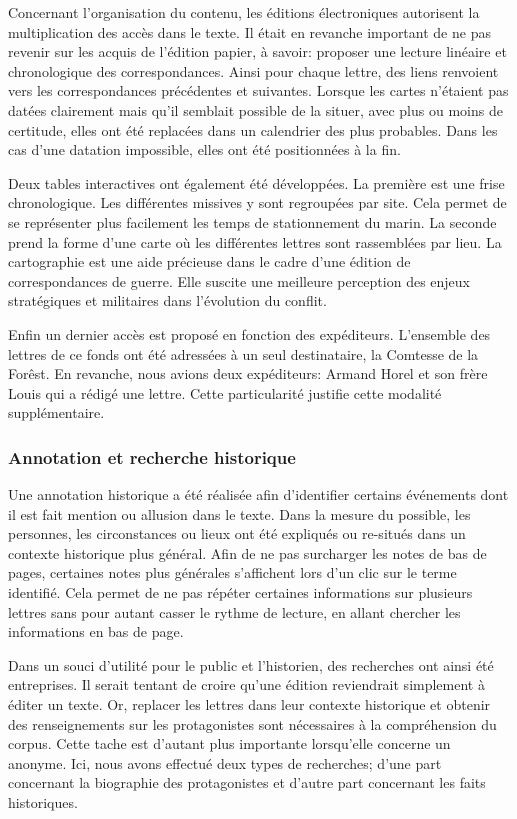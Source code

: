 \documentclass[12pt,a4paper]{book} %
\begin{document}
\medskip
Concernant l'organisation du contenu, les éditions électroniques autorisent la multiplication des accès dans le texte. Il était en revanche important de ne pas revenir sur les acquis de l'édition papier, à savoir: proposer une lecture linéaire et chronologique des correspondances. Ainsi pour chaque lettre, des liens renvoient vers les correspondances précédentes et suivantes. Lorsque les cartes n'étaient pas datées clairement mais qu'il semblait possible de la situer, avec plus ou moins de certitude, elles ont été replacées dans un calendrier des plus probables. Dans les cas d'une datation impossible, elles ont été positionnées à la fin. 

Deux \og tables \fg{} interactives ont également été développées. La première est une frise chronologique. Les différentes missives y sont regroupées par site. Cela permet de se représenter plus facilement les temps de stationnement du marin. La seconde prend la forme d'une carte où les différentes lettres sont rassemblées par lieu. La cartographie est une aide précieuse dans le cadre d'une édition de correspondances de guerre.  Elle suscite une meilleure perception des enjeux stratégiques et militaires dans l'évolution du conflit.

Enfin un dernier accès est proposé en fonction des expéditeurs. L'ensemble des lettres de ce fonds ont été adressées à un seul destinataire, la Comtesse de la Forêst. En revanche, nous avions deux expéditeurs: Armand Horel et son frère Louis qui a rédigé une lettre. Cette particularité justifie  cette modalité supplémentaire. 
 
\subsubsection{Annotation et recherche historique}
Une annotation historique a été réalisée afin d'identifier certains événements dont il est fait mention ou allusion dans le texte. Dans la mesure du possible, les personnes, les circonstances ou lieux ont été expliqués ou re-situés dans un contexte historique plus général. Afin de ne pas surcharger les notes de bas de pages, certaines notes plus générales s'affichent lors d'un clic sur le terme identifié. Cela permet de ne pas répéter certaines informations sur plusieurs lettres sans pour autant casser le rythme de lecture, en allant chercher les informations en bas de page.

Dans un souci d'utilité pour le public et l'historien, des recherches ont ainsi été entreprises. Il serait tentant de croire qu'une édition reviendrait simplement à éditer un texte. Or, replacer les lettres dans leur contexte historique et obtenir des renseignements sur les protagonistes sont nécessaires à la compréhension du corpus. Cette tache est d'autant plus importante lorsqu'elle concerne un anonyme. Ici, nous avons effectué deux types de recherches; d'une part concernant la biographie des protagonistes et d'autre part concernant les faits historiques. 
\end{document}
